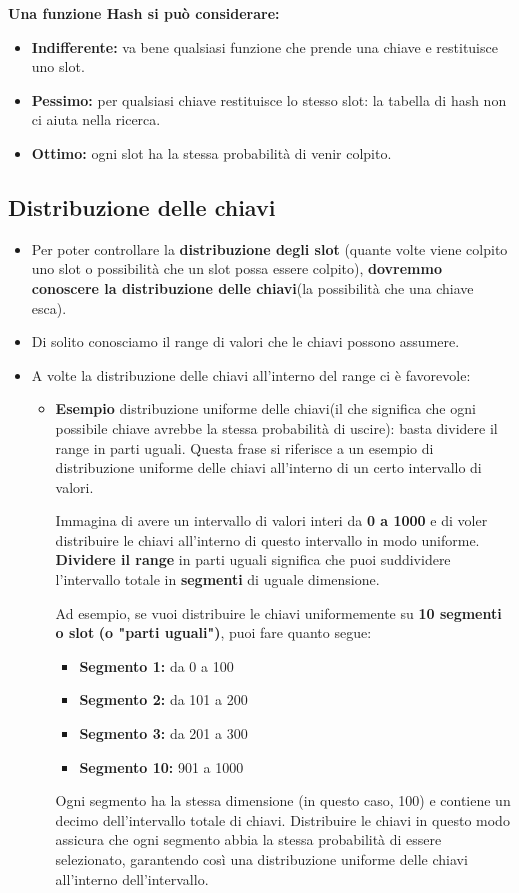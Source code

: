 \textbf{Una funzione Hash si può considerare:}
\begin{itemize}
    \item \textbf{Indifferente:} va bene qualsiasi funzione che prende una
    chiave e restituisce uno slot.
    \item \textbf{Pessimo:} per qualsiasi chiave restituisce lo stesso slot: la
    tabella di hash non ci aiuta nella ricerca.
    \item \textbf{Ottimo:} ogni slot ha la stessa probabilità di venir colpito.
\end{itemize}

\subsection{Distribuzione delle chiavi}
\begin{itemize}  
    \item Per poter controllare la \textbf{distribuzione degli slot} (quante volte viene colpito uno slot o possibilità che un slot possa essere colpito), \textbf{dovremmo conoscere la distribuzione delle chiavi}(la possibilità che una chiave esca).
    \item Di solito conosciamo il range di valori che le chiavi
    possono assumere.
    \item A volte la distribuzione delle chiavi all’interno del range ci è
    favorevole:
    \begin{itemize}
        \item \textbf{Esempio} distribuzione uniforme delle chiavi(il che significa che ogni possibile chiave avrebbe la stessa probabilità di uscire): basta
        dividere il range in parti uguali.
        Questa frase si riferisce a un esempio di distribuzione uniforme delle chiavi all'interno di un certo intervallo di valori.

        Immagina di avere un intervallo di valori interi da \textbf{0 a 1000}
        e di voler distribuire le chiavi all'interno di questo intervallo in modo uniforme. \textbf{Dividere il range} in parti uguali significa che puoi suddividere l'intervallo totale in \textbf{segmenti} di uguale dimensione.
        
        Ad esempio, se vuoi distribuire le chiavi uniformemente su \textbf{10 segmenti o slot} \textbf{(o "parti uguali")}, puoi fare quanto segue:
        \begin{itemize}
            \item \textbf{Segmento 1:} da 0 a 100
            \item \textbf{Segmento 2:} da 101 a 200
            \item \textbf{Segmento 3:} da 201 a 300
            \item \textbf{Segmento 10:} 901 a 1000
        \end{itemize}
        Ogni segmento ha la stessa dimensione (in questo caso, 100) e contiene un decimo dell'intervallo totale di chiavi. Distribuire le chiavi in questo modo assicura che ogni segmento abbia la stessa probabilità di essere selezionato, garantendo così una distribuzione uniforme delle chiavi all'interno dell'intervallo.


\end{itemize}
\end{itemize}
